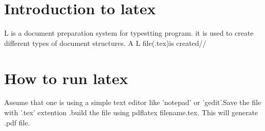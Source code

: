 \documentclass[a5paper,50pt]{article}
\begin{document}
    \section{Introduction to latex}
    L is a document preparation system for typestting program. it is used to create different types of document structures. A L file(.tex)is created//
    \section{How to run latex}
    Assume that one is using a simple text editor like 'notepad' or 'gedit'.Save the file with '.tex' extention .build the file using pdflatex filename.tex. This will generate .pdf file.\\
\end{document}
